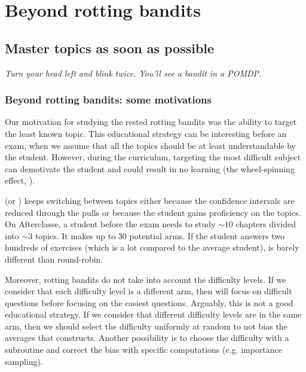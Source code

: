 \part{Beyond rotting bandits}
\chapter{Master topics as soon as possible}
\label{ch:pomdp}
\vspace{-2.8cm}
\begin{flushright}
\emph{Turn your head left and blink twice. You'll see a bandit in a POMDP.}
\end{flushright}
\vspace{0.85cm}
\section{Beyond rotting bandits: some motivations}
\label{sec:beyond}
Our motivation for studying the rested rotting bandits was the ability to target the least known topic. This educational strategy can be interesting before an exam, when we assume that all the topics should be at least understandable by the student. However, during the curriculum, targeting the most difficult subject can demotivate the student and could result in no learning (the wheel-spinning effect, \cite{beck2013wheel}).

\RAWUCB (or \FEWA)  keeps switching between topics either because the confidence intervals are reduced through the pulls or because the student gains proficiency on the topics. On Afterclasse, a student before the exam needs to study $\sim10$ chapters divided into $\sim3$ topics. It makes up to 30 potential arms. If the student answers two hundreds of exercises (which is a lot compared to the average student), \RAWUCB is barely different than round-robin. 

Moreover, rotting bandits do not take into account the difficulty levels. If we consider that each difficulty level is a different arm, then \RAWUCB will focus on difficult questions before focusing on the easiest questions. Arguably, this is not a good educational strategy. If we consider that different difficulty levels are in the same arm, then we should select the difficulty uniformly at random to not bias the averages that \RAWUCB constructs. Another possibility is to choose the difficulty with a subroutine and correct the bias with specific computations (e.g. importance sampling). 

